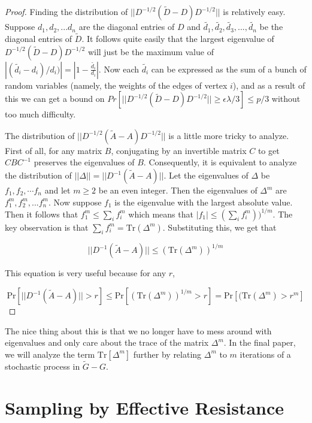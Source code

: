\documentclass[12pt,twoside]{article}
\begin{document}
\begin{proof}
Finding the distribution of $||D^{-1/2}(\tilde{D} - D)D^{-1/2}||$ is relatively easy. Suppose $d_1, d_2, ... d_n$ are the diagonal entries of $D$ and $\tilde{d_1}, \tilde{d_2}, \tilde{d_3}, ..., \tilde{d_n}$ be the diagonal entries of $\tilde{D}$. It follows quite easily that the largest eigenvalue of $D^{-1/2}(\tilde{D} - D)D^{-1/2}$ will just be the maximum value of $|(\tilde{d_i} - d_i)/d_i)| = |1 - \frac{\tilde{d_i}}{d_i}|$. Now each $\tilde{d_i}$ can be expressed as the sum of a bunch of random variables (namely, the weights of the edges of vertex $i$), and as a result of this we can get a bound on $Pr[||D^{-1/2}(\tilde{D} - D)D^{-1/2}|| \geq \epsilon\lambda/3] \leq p/3$ without too much difficulty. 

The distribution of $||D^{-1/2}(\tilde{A} - A)D^{-1/2}||$ is a little more tricky to analyze. First of all, for any matrix $B$, conjugating by an invertible matrix $C$ to get $CBC^{-1}$ preserves the eigenvalues of $B$. Consequently, it is equivalent to analyze the distribution of $||\Delta|| = ||D^{-1}(\tilde{A} - A)||$.  
Let the eigenvalues of $\Delta$ be $f_1, f_2, \cdots f_n$ and let $m \geq 2$ be an even integer. Then the eigenvalues of $\Delta^{m}$ are $f_1^m, f_2^m, ... f_n^m$. Now suppose $f_1$ is the eigenvalue with the largest absolute value. Then it follows that $f_1^m \leq \sum_i f_i^m$ which means that $|f_1| \leq (\sum_i f_i^m))^{1/m}$. The key observation is that $\sum_i f_i^m = \text{Tr}(\Delta^m)$. Substituting this, we get that

\begin{equation}
||D^{-1}(\tilde{A} - A)|| \leq (\text{Tr}(\Delta^m))^{1/m}
\end{equation}

This equation is very useful because for any $r$,

\begin{equation}
\text{Pr}[||D^{-1}(\tilde{A} - A)|| > r] \leq \text{Pr}[(\text{Tr}(\Delta^m))^{1/m} > r] = \text{Pr}[(\text{Tr}(\Delta^m) > r^m]
\end{equation}

\end{proof}

The nice thing about this is that we no longer have to mess around with eigenvalues and only care about the trace of the matrix $\Delta^m$. In the final paper, we will analyze the term $\text{Tr}[\Delta^m]$ further by relating $\Delta^m$ to $m$ iterations of a stochastic process in $\tilde{G} - G$. 


\section{Sampling by Effective Resistance}
\end{document}
